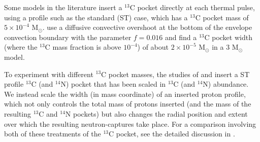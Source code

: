 Some models in the literature insert a $^{13}$C pocket directly at each thermal pulse, using a profile such as the \citet{Gallino:1998eg} standard (ST) case, which has a $^{13}$C pocket mass of $5 \times 10^{-4}$ M$_\odot$. \citet{Herwig:2001vb} use a diffusive convective overshoot at the bottom of the envelope convection boundary with the parameter $f=0.016$ and find a $^{13}$C pocket width (where the $^{13}$C mass fraction is above $10^{-4}$) of about $2 \times 10^{-5}$ M$_\odot$ in a 3 M$_\odot$ model.

To experiment with different $^{13}$C pocket masses, the studies of \citet{Arlandini:1999eh} and \citet{Bisterzo:2010cd,Bisterzo:2012bf} insert a \citet{Gallino:1998eg} ST profile $^{13}$C (and $^{14}$N) pocket that has been scaled in $^{13}$C (and $^{14}$N) abundance. We instead scale the width (in mass coordinate) of an inserted proton profile, which not only controls the total mass of protons inserted (and the mass of the resulting $^{13}$C and $^{14}$N pockets) but also changes the radial position and extent over which the resulting neutron-captures take place. For a comparison involving both of these treatments of the $^{13}$C pocket, see the detailed discussion in \citet{Lugaro:2012ht}.

